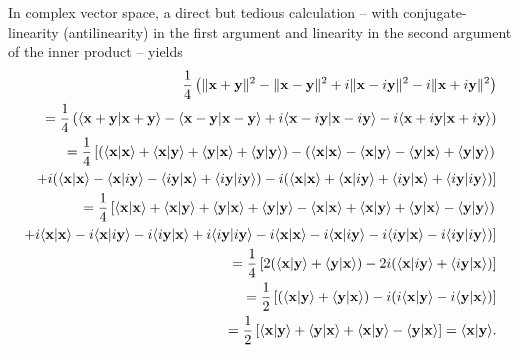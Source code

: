 {\color{OliveGreen}
\bproof
In complex vector space,  a direct but tedious calculation
-- with conjugate-linearity (antilinearity)
in the first argument and linearity in the second argument of the inner product -- yields
\begin{equation}
\begin{split}
\frac{1}{4}\left(
\|  {\bf x}+ {\bf y} \|^2
-
\|  {\bf x}- {\bf y} \|^2
+ i
\|  {\bf x}- i{\bf y} \|^2
- i
\|  {\bf x}+ i{\bf y} \|^2
\right)
\\
=
\frac{1}{4}\left(
\langle {\bf x}+ {\bf y} \vert {\bf x}+ {\bf y}\rangle
-
\langle {\bf x}- {\bf y} \vert {\bf x}- {\bf y}\rangle
+ i
 \langle {\bf x}- i{\bf y} \vert {\bf x} -i {\bf y}\rangle
- i   \langle {\bf x}+ i{\bf y} \vert {\bf x}+ i{\bf y}\rangle
\right)
\\
=
\frac{1}{4}\left[
(
\langle {\bf x} \vert {\bf x}\rangle +
\langle {\bf x} \vert {\bf y}\rangle +
\langle {\bf y} \vert  {\bf x}\rangle +
\langle {\bf y} \vert {\bf y}\rangle
)
-
(
 \langle {\bf x} \vert {\bf x}\rangle    -
\langle {\bf x} \vert {\bf y}\rangle    -
\langle {\bf y} \vert {\bf x}\rangle    +
\langle {\bf y} \vert {\bf y}\rangle
)
\right.
\\
\left.
+ i
(
\langle {\bf x} \vert {\bf x}\rangle -
\langle {\bf x} \vert i {\bf y}\rangle  -
\langle i{\bf y} \vert {\bf x}\rangle  +
\langle  i{\bf y} \vert i {\bf y}\rangle
)
- i
(
\langle {\bf x} \vert {\bf x}\rangle +
\langle {\bf x} \vert  i{\bf y}\rangle  +
\langle i{\bf y} \vert {\bf x}\rangle   +
\langle i{\bf y} \vert i{\bf y}\rangle
)
\right]
\\
=
\frac{1}{4}\left[
\langle {\bf x} \vert {\bf x}\rangle +
\langle {\bf x} \vert {\bf y}\rangle +
\langle {\bf y} \vert  {\bf x}\rangle +
\langle {\bf y} \vert {\bf y}\rangle
-
\langle {\bf x} \vert {\bf x}\rangle    +
\langle {\bf x} \vert {\bf y}\rangle    +
\langle {\bf y} \vert {\bf x}\rangle    -
\langle {\bf y} \vert {\bf y}\rangle
)
\right.
\\
\left.
+
i \langle {\bf x} \vert {\bf x}\rangle -
i\langle {\bf x} \vert  i{\bf y}\rangle  -
i\langle i{\bf y} \vert {\bf x}\rangle   +
i\langle i{\bf y} \vert i{\bf y}\rangle
-
i\langle {\bf x} \vert {\bf x}\rangle -
i\langle {\bf x} \vert i {\bf y}\rangle -
i\langle i{\bf y} \vert {\bf x}\rangle  -
i\langle  i{\bf y} \vert i {\bf y}\rangle
)
\right]
\\
=
\frac{1}{4}\left[
2 (
\langle {\bf x} \vert {\bf y}\rangle +
\langle {\bf y} \vert  {\bf x}\rangle
)
- 2 i (
\langle {\bf x} \vert  i{\bf y}\rangle  +
\langle i{\bf y} \vert {\bf x}\rangle
)
\right]
\\
=
\frac{1}{2}\left[
(
\langle {\bf x} \vert {\bf y}\rangle +
\langle {\bf y} \vert  {\bf x}\rangle
)
- i (
i\langle {\bf x} \vert  {\bf y}\rangle     -
i\langle {\bf y} \vert {\bf x}\rangle
)
\right]
\\
=
\frac{1}{2}\left[
\langle {\bf x} \vert {\bf y}\rangle +
\langle {\bf y} \vert  {\bf x}\rangle
+
\langle {\bf x} \vert  {\bf y}\rangle
-\langle {\bf y} \vert {\bf x}\rangle
\right]
=
\langle {\bf x} \vert {\bf y}\rangle
.
\end{split}
\label{2015-m-ch-polidc2}
\end{equation}
\eproof
}


